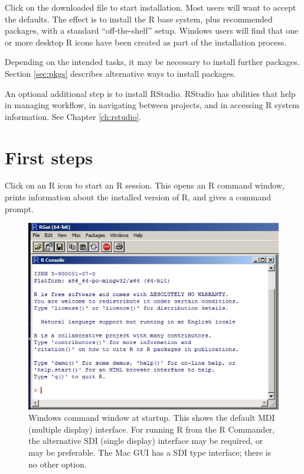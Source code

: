 \documentclass{tufte-book}\usepackage[]{graphicx}\usepackage[]{color}
\begin{document}
Click on the downloaded file to start installation.  Most users will
want to accept the defaults.  The effect is to install the R base
system, plus recommended packages, with a standard ``off-the-shelf''
setup.  Windows users will find that one or more desktop R icons have
been created as part of the installation process.

Depending on the intended tasks, it may be necessary to install
further packages. Section \ref{sec:pkgs} describes alternative
ways to install packages.

An optional additional step is to install RStudio.
  RStudio has abilities that
help in managing workflow, in navigating between projects, and in
accessing R system information.  See Chapter \ref{ch:rstudio}.

\section{First steps}\label{sec:step1}

Click on an R icon to start an R session.  This opens an R command
window, prints information about the installed version of R, and
gives a command prompt.

\begin{figure}
\includegraphics[trim=0 18 0 0]{figs-inc/01i-gui.jpg}
\caption{Windows command window at startup. This shows the default MDI
  (multiple display) interface. For running R from the R Commander,
  the alternative SDI (single display) interface may be required, or
  may be preferable.  The Mac GUI has a SDI type interface; there is
  no other option.}
\end{figure}
\end{document}

